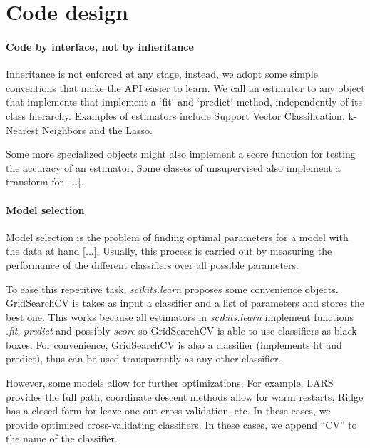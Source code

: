 \documentclass[twoside,11pt]{article}
\begin{document}
\section{Code design}

\paragraph{Code by interface, not by inheritance}

Inheritance is not enforced at any stage, instead, we adopt some
simple conventions that make the API easier to learn. We call an
estimator to any object that implements that implement a `fit` and
`predict` method, independently of its class hierarchy. Examples of
estimators include Support Vector Classification, k-Nearest Neighbors
and the Lasso.

Some more specialized objects might also implement a score function
for testing the accuracy of an estimator. Some classes of unsupervised
also implement a transform for [...].




\paragraph {Model selection}

Model selection is the problem of finding optimal parameters for a
model with the data at hand [...]. Usually, this process is carried
out by measuring the performance of the different classifiers over all
possible parameters.

To ease this repetitive task, \emph{scikits.learn} proposes some convenience
objects. GridSearchCV is takes as input a classifier and a list of
parameters and stores the best one. This works because all estimators
in \emph{scikits.learn} implement functions .\emph{fit}, \emph{predict} and
possibly \emph{score} so GridSearchCV is able to use classifiers as
black boxes. For convenience, GridSearchCV is also a classifier
(implements fit and predict), thus can be used transparently as any
other classifier.

However, some models allow for further optimizations. For example,
LARS provides the full path, coordinate descent methods allow for warm
restarts, Ridge has a closed form for leave-one-out cross validation,
etc. In these cases, we provide optimized cross-validating
classifiers. In these cases, we append ``CV'' to the name of the
classifier.
\end{document}
